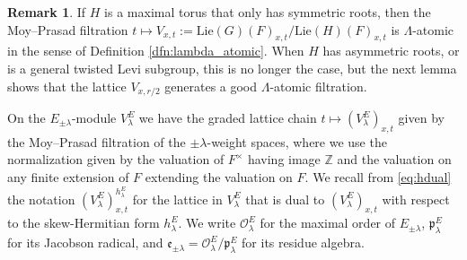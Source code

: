 \documentclass{article}
\def\mf#1{\mathfrak{#1}}
\def\Z{\mathbb{Z}}
\def\cO{\mathcal{O}}
\theoremstyle{definition}
\newtheorem{rem}[thm]{Remark}
\numberwithin{equation}{subsection}
\renewcommand{\-}{\hyp{}}
\begin{document}
\begin{rem}
	If $H$ is a maximal torus that only has symmetric roots, then the Moy--Prasad filtration $t \mapsto V_{x,t}:=\mathrm{Lie}(G)(F)_{x,t}/\mathrm{Lie}(H)(F)_{x,t}$ is $\Lambda$-atomic in the sense of Definition \ref{dfn:lambda_atomic}. When $H$ has asymmetric roots, or is a general twisted Levi subgroup, this is no longer the case, but the next lemma shows that the lattice $V_{x,r/2}$ generates a good $\Lambda$-atomic filtration.
\end{rem}



On the $E_{\pm\lambda}$-module $V_\lambda^E$ we have the graded lattice chain $t \mapsto (V_\lambda^E)_{x,t}$ given by the Moy--Prasad filtration of the $\pm\lambda$-weight spaces, where we use the normalization given by the valuation of $F^\times$ having image $\Z$ and the valuation on any finite extension of $F$ extending the valuation on $F$. We recall from \eqref{eq:hdual} the notation $(V_\lambda^E)_{x,t}^{h_\lambda^E}$ for the lattice in $V_\lambda^E$ that is dual to $(V_\lambda^E)_{x,t}$ with respect to the skew-Hermitian form $h_\lambda^E$. We write $\cO_\lambda^E$ for the maximal order of $E_{\pm\lambda}$, $\mf p_\lambda^E$ for its Jacobson radical, and $\mathfrak e_{\pm\lambda}=\cO_\lambda^E/\mf p_\lambda^E$ for its residue algebra. 
\end{document}
